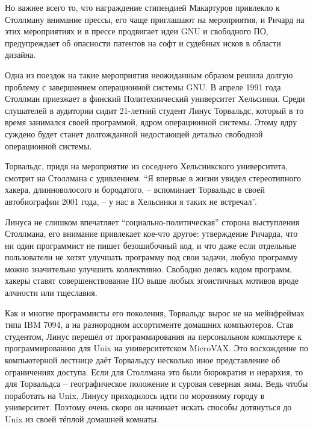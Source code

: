 Но важнее всего то, что награждение стипендией Макартуров привлекло к Столлману внимание прессы, его чаще приглашают на мероприятия, и Ричард на этих мероприятиях и в прессе продвигает идеи GNU и свободного ПО, предупреждает об опасности патентов на софт и судебных исков в области дизайна.

Одна из поездок на такие мероприятия неожиданным образом решила долгую проблему с завершением операционной системы GNU. В апреле 1991 года Столлман приезжает в финский Политехнический университет Хельсинки. Среди слушателей в аудитории сидит 21-летний студент Линус Торвальдс, который в то время занимался своей программой, ядром операционной системы. Этому ядру суждено будет станет долгожданной недостающей деталью свободной операционной системы.

Торвальдс, придя на мероприятие из соседнего Хельсинкского университета, смотрит на Столлмана с удивлением. \enquote{Я впервые в жизни увидел стереотипного хакера, длинноволосого и бородатого, -- вспоминает Торвальдс в своей автобиографии 2001 года, -- у нас в Хельсинки я таких не встречал}. 

Линуса не слишком впечатляет \enquote{социально-политическая} сторона выступления Столлмана, его внимание привлекает кое-что другое: утверждение Ричарда, что ни один программист не пишет безошибочный код, и что даже если отдельные пользователи не хотят улучшать программу под свои задачи, любую программу можно значительно улучшить коллективно. Свободно делясь кодом программ, хакеры ставят совершенствование ПО выше любых эгоистичных мотивов вроде алчности или тщеславия.

Как и многие программисты его поколения, Торвальдс вырос не на мейнфреймах типа IBM 7094, а на разнородном ассортименте домашних компьютеров. Став студентом, Линус перешёл от программирования на персональном компьютере к программированию для Unix на университетском MicroVAX. Это восхождение по компьютерной лестнице даёт Торвальдсу несколько иное представление об ограничениях доступа. Если для Столлмана это были бюрократия и иерархия, то для Торвальдса -- географическое положение и суровая северная зима. Ведь чтобы поработать на Unix, Линусу приходилось идти по морозному городу в университет. Поэтому очень скоро он начинает искать способы дотянуться до Unix из своей тёплой домашней комнаты.

